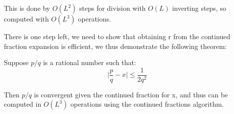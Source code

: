 This is done by $O(L^2)$ steps for division with $O(L)$ inverting steps, so computed with $O(L^3)$ operations.

There is one step left, we need to show that obtaining r from the continued fraction expansion is efficient, we thus demonstrate the following theorem:

\begin{theorem}
Suppose $p/q$ is a rational number such that:
\begin{equation*}
    \bigg| \frac{p}{q} - x \bigg| \leq \frac{1}{2q^2}
\end{equation*}

Then $p/q$ is convergent given the continued fraction for x, and thus can be computed in $O(L^3)$ operations using the continued fractions algorithm.
\end{theorem}

